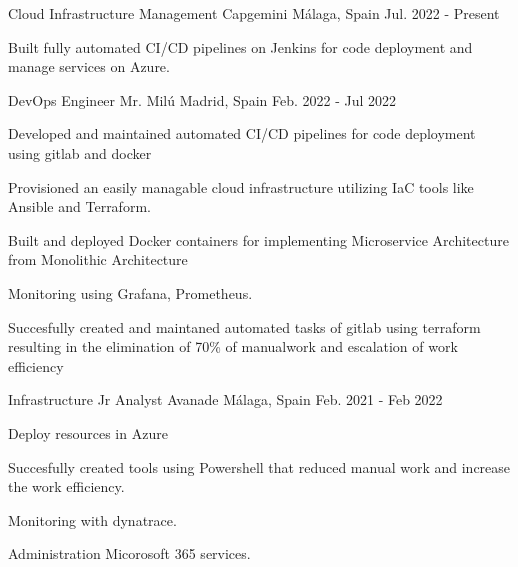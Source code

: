 
\begin{cventries}

\cventry
    {Cloud Infrastructure Management} %
    {Capgemini} %
    {Málaga, Spain} %
    {Jul. 2022 - Present} %
    {
      \begin{cvitems} %
        \item {Built fully automated CI/CD pipelines on Jenkins for code deployment and manage services on Azure.}
      \end{cvitems}
    }

\cventry
    {DevOps Engineer} %
    {Mr. Milú} %
    {Madrid, Spain} %
    {Feb. 2022 - Jul 2022} %
    {
      \begin{cvitems} %
        \item {Developed and maintained automated CI/CD pipelines for code deployment using gitlab and docker}
        \item {Provisioned an easily managable cloud infrastructure utilizing IaC tools like Ansible and Terraform.}
        \item {Built and deployed Docker containers for implementing Microservice Architecture from Monolithic Architecture}
        \item {Monitoring using Grafana, Prometheus.}
        \item {Succesfully created and maintaned automated tasks of gitlab using terraform resulting in the elimination of 70\% of manual\newline work and escalation of work efficiency}
      \end{cvitems}
    }

  \cventry
    {Infrastructure Jr Analyst} %
    {Avanade} %
    {Málaga, Spain} %
    {Feb. 2021 - Feb 2022} %
    {
      \begin{cvitems} %
        \item {Deploy resources in Azure}
        \item {Succesfully created tools using Powershell that reduced manual work and increase the work efficiency.}
        \item {Monitoring with dynatrace.}
        \item {Administration Micorosoft 365 services.}
      \end{cvitems}
    }

\end{cventries}

